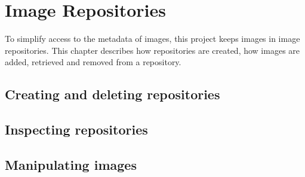 %
%
%
\chapter{Image Repositories\label{chapter:imagerepo}}
To simplify access to the metadata of images, this project keeps
images in image repositories. 
This chapter describes how repositories are created, how images
are added, retrieved and removed from a repository.

\section{Creating and deleting repositories}

\section{Inspecting repositories}

\section{Manipulating images}


